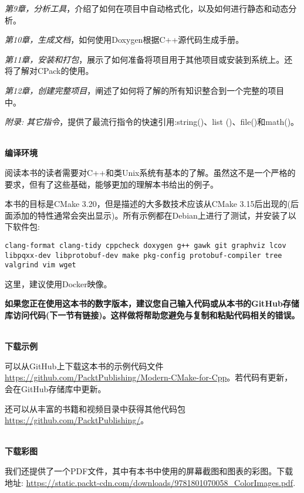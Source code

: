 \textit{第9章，分析工具}，介绍了如何在项目中自动格式化，以及如何进行静态和动态分析。

\textit{第10章，生成文档}，如何使用Doxygen根据C++源代码生成手册。

\textit{第11章，安装和打包}，展示了如何准备将项目用于其他项目或安装到系统上。还将了解对CPack的使用。

\textit{第12章，创建完整项目}，阐述了如何将了解的所有知识整合到一个完整的项目中。

\textit{附录: 其它指令}，提供了最流行指令的快速引用:string()、list ()、file()和math()。

\hspace*{\fill} \\ %
\textbf{编译环境}

阅读本书的读者需要对C++和类Unix系统有基本的了解。虽然这不是一个严格的要求，但有了这些基础，能够更加的理解本书给出的例子。

本书的目标是CMake 3.20，但是描述的大多数技术应该从CMake 3.15后出现的(后面添加的特性通常会突出显示)。所有示例都在Debian上进行了测试，并安装了以下软件包:

\texttt{clang-format clang-tidy cppcheck doxygen g++ gawk git graphviz lcov libpqxx-dev libprotobuf-dev make pkg-config protobuf-compiler tree valgrind vim wget}

这里，建议使用Docker映像。

\textbf{如果您正在使用这本书的数字版本，建议您自己输入代码或从本书的GitHub存储库访问代码(下一节有链接)。这样做将帮助您避免与复制和粘贴代码相关的错误。}

\hspace*{\fill} \\ %
\textbf{下载示例}

可以从GitHub上下载这本书的示例代码文件 \url{https://github.com/PacktPublishing/Modern-CMake-for-Cpp}。若代码有更新，会在GitHub存储库中更新。

还可以从丰富的书籍和视频目录中获得其他代码包\url{https://github.com/PacktPublishing/}。


\hspace*{\fill} \\ %
\textbf{下载彩图}

我们还提供了一个PDF文件，其中有本书中使用的屏幕截图和图表的彩图。下载地址: \url{https://static.packt-cdn.com/downloads/9781801070058_ColorImages.pdf}.










